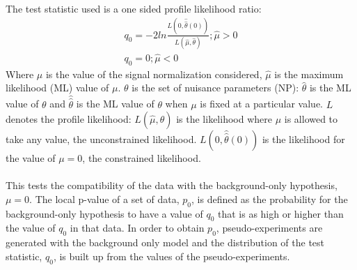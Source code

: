 \paragraph{}
The test statistic used is a one sided profile likelihood ratio:
\begin{eqnarray}
  {q_{0}} = -2 ln \frac{L(0,\hat{\hat{\theta}}(0))}{L(\hat{\mu},\hat{\theta})}; \hat{\mu} > 0 \\
  {q_{0}} =  0 ; \hat{\mu} < 0 
\end{eqnarray}
Where $\mu$ is the value of the signal normalization considered, $\hat{\mu}$ is the maximum likelihood (ML) value of $\mu$. 
$\theta$ is the set of nuisance parameters (NP): $\hat{\theta}$ is the ML value of $\theta$ and 
$\hat{\hat{\theta}}$ is the ML value of $\theta$ when $\mu$ is fixed at a particular value. 
$L$ denotes the profile likelihood: $L(\hat{\mu},\hat{\theta})$ is the likelihood where $\mu$ is allowed to take any value, the unconstrained likelihood. 
$L(0,\hat{\hat{\theta}}(0))$ is the likelihood for the value of $\mu = 0$, the constrained likelihood.

\paragraph{}
This tests the compatibility of the data with the background-only hypothesis, $\mu = 0$. 
The local p-value of a set of data, $p_0$, is defined as the probability for the 
background-only hypothesis to have a value of $q_0$ that is as high or higher than the 
value of $q_{0}$ in that data.
In order to obtain $p_0$, pseudo-experiments are generated with the background only 
model and the distribution of the test statistic, $q_{0}$, is built up from the 
values of the pseudo-experiments.


